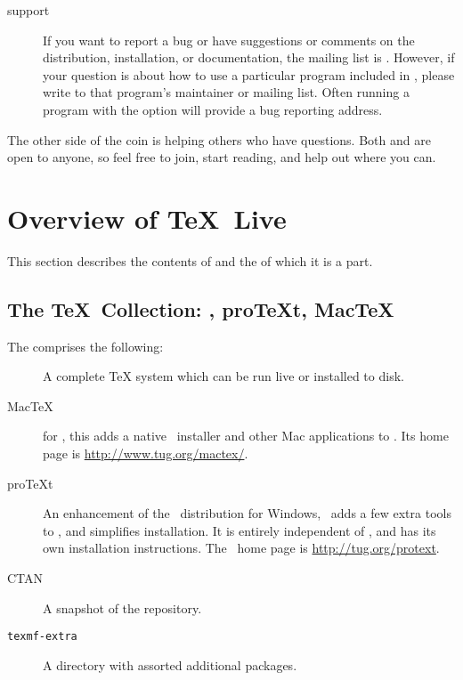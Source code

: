 \documentclass{article}
\begin{document}
\begin{description}
\item [\TL{} support] If you want to report a bug or have
suggestions or comments on the \TL{} distribution, installation, or
documentation, the mailing list is .  However,
if your question is about how to use a particular program included in
\TL{}, please write to that program's maintainer or
mailing list.  Often running a program with the  option
will provide a bug reporting address.

\end{description}

The other side of the coin is helping others who have questions.  Both
 and  are open to anyone, so feel
free to join, start reading, and help out where you can.  


\section{Overview of \protect\TeX\protect\ Live}
\label{sec:overview-tl}

This section describes the contents of \TL{} and the \TK{} of which it
is a part.

\subsection{The \protect\TeX\protect\ Collection: \TL, pro\TeX{}t, Mac\TeX}
\label{sec:tl-coll-dists}

The \TK{} \DVD{} comprises the following:

\begin{description}

\item [\TL] A complete \TeX{} system which can be run live or
  installed to disk.

\item [Mac\TeX] for \MacOSX, this adds a native \MacOSX\ installer and other
Mac applications to \TL{}.  Its home page is
\url{http://www.tug.org/mactex/}.  

\item [pro\TeX{}t] An enhancement of the \MIKTEX\ distribution for Windows,
\ProTeXt\ adds a few extra tools to \MIKTEX, and simplifies
installation.  It is entirely independent of \TL{}, and has its own
installation instructions.  The \ProTeXt\ home page is
\url{http://tug.org/protext}.

\item [CTAN] A snapshot of the \CTAN{} repository.

\item [\texttt{texmf-extra}] A directory with assorted additional packages.

\end{description}
\end{document}
